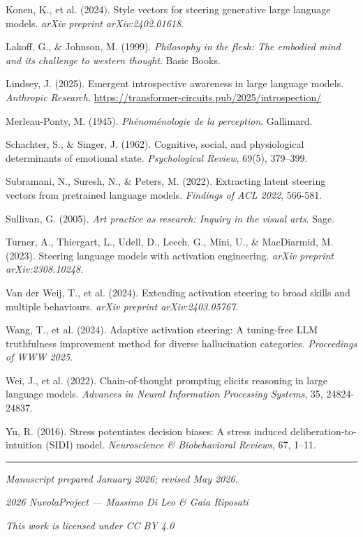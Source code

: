 \documentclass[11pt,a4paper]{article}
\begin{document}
Konen, K., et al. (2024). Style vectors for steering generative large language models. \emph{arXiv preprint arXiv:2402.01618}.

Lakoff, G., \& Johnson, M. (1999). \emph{Philosophy in the flesh: The embodied mind and its challenge to western thought}. Basic Books.

Lindsey, J. (2025). Emergent introspective awareness in large language models. \emph{Anthropic Research}. \url{https://transformer-circuits.pub/2025/introspection/}

Merleau-Ponty, M. (1945). \emph{Ph\'{e}nom\'{e}nologie de la perception}. Gallimard.

Schachter, S., \& Singer, J. (1962). Cognitive, social, and physiological determinants of emotional state. \emph{Psychological Review}, 69(5), 379--399.

Subramani, N., Suresh, N., \& Peters, M. (2022). Extracting latent steering vectors from pretrained language models. \emph{Findings of ACL 2022}, 566-581.

Sullivan, G. (2005). \emph{Art practice as research: Inquiry in the visual arts}. Sage.

Turner, A., Thiergart, L., Udell, D., Leech, G., Mini, U., \& MacDiarmid, M. (2023). Steering language models with activation engineering. \emph{arXiv preprint arXiv:2308.10248}.

Van der Weij, T., et al. (2024). Extending activation steering to broad skills and multiple behaviours. \emph{arXiv preprint arXiv:2403.05767}.

Wang, T., et al. (2024). Adaptive activation steering: A tuning-free LLM truthfulness improvement method for diverse hallucination categories. \emph{Proceedings of WWW 2025}.

Wei, J., et al. (2022). Chain-of-thought prompting elicits reasoning in large language models. \emph{Advances in Neural Information Processing Systems}, 35, 24824-24837.

Yu, R. (2016). Stress potentiates decision biases: A stress induced deliberation-to-intuition (SIDI) model. \emph{Neuroscience \& Biobehavioral Reviews}, 67, 1--11.

\bigskip\hrule\bigskip

\emph{Manuscript prepared January 2026; revised May 2026.}

\emph{\textcopyright{} 2026 NuvolaProject --- Massimo Di Leo \& Gaia Riposati}

\emph{This work is licensed under CC BY 4.0}
\end{document}
